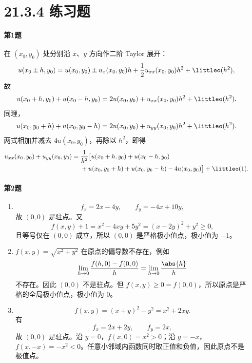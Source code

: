 \section*{21.3.4 练习题}

\paragraph{第1题}
\begin{xsolution}
在 $(x_0,y_0)$ 处分别沿 $x$、$y$ 方向作二阶 Taylor 展开：
\[
  u(x_0\pm h,y_0)
  =u(x_0,y_0)\pm u_x(x_0,y_0)h
  +\frac12u_{xx}(x_0,y_0)h^2+\littleo(h^2),
\]
故
\[
  u(x_0+h,y_0)+u(x_0-h,y_0)
  =2u(x_0,y_0)+u_{xx}(x_0,y_0)h^2+\littleo(h^2).
\]
同理，
\[
  u(x_0,y_0+h)+u(x_0,y_0-h)
  =2u(x_0,y_0)+u_{yy}(x_0,y_0)h^2+\littleo(h^2).
\]
两式相加并减去 $4u(x_0,y_0)$，再除以 $h^2$，即得
\[
\begin{aligned}
  u_{xx}(x_0,y_0)+u_{yy}(x_0,y_0)
  ={}&\frac1{h^2}\bigl[u(x_0+h,y_0)+u(x_0-h,y_0)\\
  &+u(x_0,y_0+h)+u(x_0,y_0-h)-4u(x_0,y_0)\bigr]
  +\littleo(1).
\end{aligned}
\]
\end{xsolution}

\paragraph{第2题}
\begin{xsolution}
\begin{enumerate}[label=(\arabic*)]
  \item
  \[
    f_x=2x-4y,
    \qquad
    f_y=-4x+10y,
  \]
  故 $(0,0)$ 是驻点。又
  \[
    f(x,y)+1=x^2-4xy+5y^2=(x-2y)^2+y^2\ge0,
  \]
  且等号仅在 $(0,0)$ 成立，所以 $(0,0)$ 是严格极小值点，极小值为 $-1$。

  \item $f(x,y)=\sqrt{x^2+y^2}$ 在原点的偏导数不存在，例如
  \[
    \lim_{h\to0}\frac{f(h,0)-f(0,0)}h
    =\lim_{h\to0}\frac{\abs{h}}h
  \]
  不存在。因此 $(0,0)$ 不是驻点。但 $f(x,y)\ge0=f(0,0)$，所以原点是严格的全局极小值点，极小值为 $0$。

  \item
  \[
    f(x,y)=(x+y)^2-y^2=x^2+2xy.
  \]
  有
  \[
    f_x=2x+2y,
    \qquad
    f_y=2x,
  \]
  故 $(0,0)$ 是驻点。沿 $y=0$，$f(x,0)=x^2>0$；沿 $y=-x$，$f(x,-x)=-x^2<0$。任意小邻域内函数同时取正值和负值，因此原点不是极值点。
\end{enumerate}
\end{xsolution}

